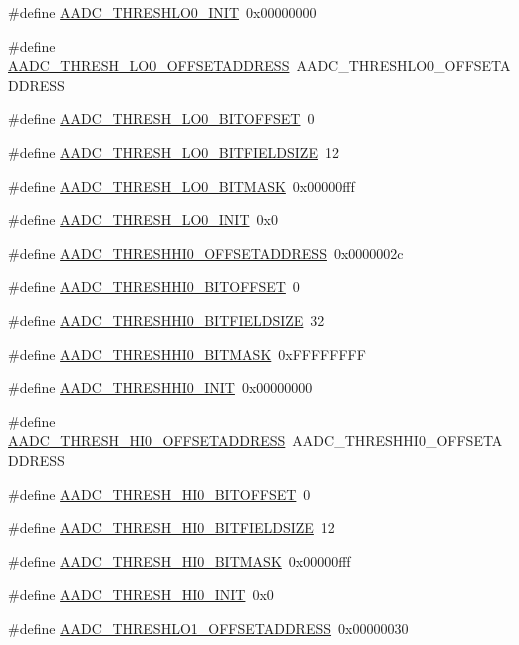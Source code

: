 \begin{DoxyCompactItemize}
\item 
\#define \hyperlink{a00543_a18721344f960eb97230f5451a881843d}{AADC\_\-THRESHLO0\_\-INIT}~0x00000000
\item 
\#define \hyperlink{a00543_acc03f62a4c8ec3832a20fb9b56865b92}{AADC\_\-THRESH\_\-LO0\_\-OFFSETADDRESS}~AADC\_\-THRESHLO0\_\-OFFSETADDRESS
\item 
\#define \hyperlink{a00543_a0f5c565ed62e708bca7d10606d50ca06}{AADC\_\-THRESH\_\-LO0\_\-BITOFFSET}~0
\item 
\#define \hyperlink{a00543_a394359e4fa50e3cea6dc6d4d3cbeca82}{AADC\_\-THRESH\_\-LO0\_\-BITFIELDSIZE}~12
\item 
\#define \hyperlink{a00543_a7c6008c561d7ec70d327794387e84334}{AADC\_\-THRESH\_\-LO0\_\-BITMASK}~0x00000fff
\item 
\#define \hyperlink{a00543_a490fe8d80817f7ea192776dc69516a3c}{AADC\_\-THRESH\_\-LO0\_\-INIT}~0x0
\item 
\#define \hyperlink{a00543_a657a4cbff3b99de558f33821861c99ee}{AADC\_\-THRESHHI0\_\-OFFSETADDRESS}~0x0000002c
\item 
\#define \hyperlink{a00543_afbc05e8067f14ca84b25d64589ada069}{AADC\_\-THRESHHI0\_\-BITOFFSET}~0
\item 
\#define \hyperlink{a00543_adb7a9a48aa3d24ce1ea980a45649ca1c}{AADC\_\-THRESHHI0\_\-BITFIELDSIZE}~32
\item 
\#define \hyperlink{a00543_a1c55502f312eb5fbfb4237dc6f5d96f1}{AADC\_\-THRESHHI0\_\-BITMASK}~0xFFFFFFFF
\item 
\#define \hyperlink{a00543_a89d784b65a4df426aa34b6d47d735d29}{AADC\_\-THRESHHI0\_\-INIT}~0x00000000
\item 
\#define \hyperlink{a00543_a5fc112b61373acd15072e4f90067b6de}{AADC\_\-THRESH\_\-HI0\_\-OFFSETADDRESS}~AADC\_\-THRESHHI0\_\-OFFSETADDRESS
\item 
\#define \hyperlink{a00543_ad3b87e5bc35c14525c69094f2eb17430}{AADC\_\-THRESH\_\-HI0\_\-BITOFFSET}~0
\item 
\#define \hyperlink{a00543_afb51feb79c64ec56f502f613045fdbd2}{AADC\_\-THRESH\_\-HI0\_\-BITFIELDSIZE}~12
\item 
\#define \hyperlink{a00543_ac008c6abe9e2dba44028fdce929cecb3}{AADC\_\-THRESH\_\-HI0\_\-BITMASK}~0x00000fff
\item 
\#define \hyperlink{a00543_afb968c3639be8d03993b295d7dfdceb2}{AADC\_\-THRESH\_\-HI0\_\-INIT}~0x0
\item 
\#define \hyperlink{a00543_abbd6729ad9d437129aa6b2c2a238fa09}{AADC\_\-THRESHLO1\_\-OFFSETADDRESS}~0x00000030

\end{DoxyCompactItemize}
